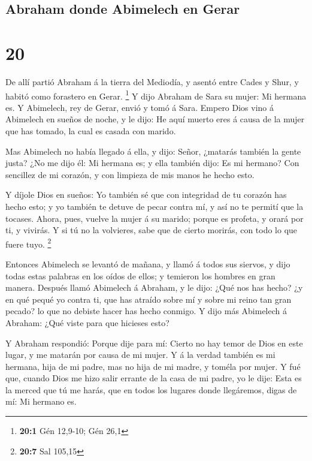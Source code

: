 \hypertarget{abraham-donde-abimelech-en-gerar}{%
\subsection{Abraham donde Abimelech en
Gerar}\label{abraham-donde-abimelech-en-gerar}}

\hypertarget{section-19}{%
\section{20}\label{section-19}}

 De allí partió Abraham á la tierra del Mediodía, y asentó
entre Cades y Shur, y habitó como forastero en Gerar. \footnote{\textbf{20:1}
  Gén 12,9-10; Gén 26,1}  Y dijo Abraham de Sara su mujer:
Mi hermana es. Y Abimelech, rey de Gerar, envió y tomó á Sara.
 Empero Dios vino á Abimelech en sueños de noche, y le
dijo: He aquí muerto eres á causa de la mujer que has tomado, la cual es
casada con marido.

 Mas Abimelech no había llegado á ella, y dijo: Señor,
¿matarás también la gente justa?  ¿No me dijo él: Mi
hermana es; y ella también dijo: Es mi hermano? Con sencillez de mi
corazón, y con limpieza de mis manos he hecho esto.

 Y díjole Dios en sueños: Yo también sé que con integridad
de tu corazón has hecho esto; y yo también te detuve de pecar contra mí,
y así no te permití que la tocases.  Ahora, pues, vuelve
la mujer á su marido; porque es profeta, y orará por ti, y vivirás. Y si
tú no la volvieres, sabe que de cierto morirás, con todo lo que fuere
tuyo. \footnote{\textbf{20:7} Sal 105,15}

 Entonces Abimelech se levantó de mañana, y llamó á todos
sus siervos, y dijo todas estas palabras en los oídos de ellos; y
temieron los hombres en gran manera.  Después llamó
Abimelech á Abraham, y le dijo: ¿Qué nos has hecho? ¿y en qué pequé yo
contra ti, que has atraído sobre mí y sobre mi reino tan gran pecado? lo
que no debiste hacer has hecho conmigo.  Y dijo más
Abimelech á Abraham: ¿Qué viste para que hicieses esto?

 Y Abraham respondió: Porque dije para mí: Cierto no hay
temor de Dios en este lugar, y me matarán por causa de mi mujer.
 Y á la verdad también es mi hermana, hija de mi padre,
mas no hija de mi madre, y toméla por mujer.  Y fué que,
cuando Dios me hizo salir errante de la casa de mi padre, yo le dije:
Esta es la merced que tú me harás, que en todos los lugares donde
llegáremos, digas de mí: Mi hermano es.

